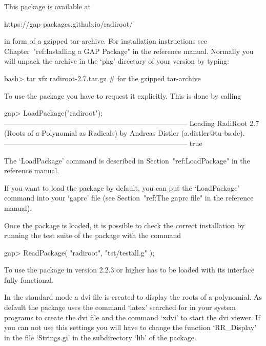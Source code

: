 


This package is available at

\begintt
https://gap-packages.github.io/radiroot/
\endtt

in form of a gzipped tar-archive. For installation instructions see
Chapter~"ref:Installing a GAP Package" in the {\GAP} reference manual. 
Normally you will unpack the archive in the `pkg' directory of your
{\GAP} version by typing:

\beginexample
    bash> tar xfz radiroot-2.7.tar.gz        # for the gzipped tar-archive
\endexample


To use the {\Radiroot} package you have to request it explicitly. This  is
done by calling

\beginexample
gap> LoadPackage("radiroot");
-----------------------------------------------------------------------------
Loading  RadiRoot 2.7 (Roots of a Polynomial as Radicals)
by Andreas Distler (a.distler@tu-bs.de).
-----------------------------------------------------------------------------
true
\endexample

The `LoadPackage' command is described  in  Section~"ref:LoadPackage"  in
the {\GAP} reference manual.

If you want to load the {\Radiroot} package by default, you  can  put  the
`LoadPackage' command  into  your  `gaprc'  file  (see  Section~"ref:The
gaprc file" in the {\GAP} reference manual).

Once the package is loaded, it is possible to check the correct
    installation by running the test suite of the package with the command

\beginexample
    gap> ReadPackage( "radiroot", "tst/testall.g" );
\endexample


To use {\Radiroot} the package {\Alnuth} in version 2.2.3 or higher
has to be loaded with its interface fully functional.

In the standard mode a dvi file is created to display the roots of a
polynomial. As default the package uses the command `latex' searched
for in your system programs to create the dvi file and the command
`xdvi' to start the dvi viewer. If you can not use this settings you
will have to change the function `RR_Display' in the file `Strings.gi'
in the subdirectory `lib' of the package.


